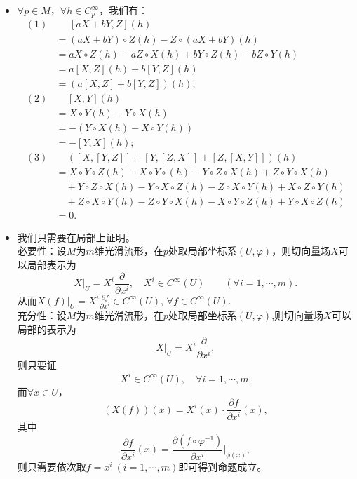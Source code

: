 
	\begin {itemize}
        \item[2.]
	${\forall} p \in M$，${\forall} h \in  C^\infty_p$，我们有：
\begin{equation*} %
	  	\begin{split}
	  	(1)&\quad\ \,	[aX+bY,Z](h)\\
	  		& = (aX+bY)\circ Z(h)-Z\circ(aX+bY)(h)\\
	  		& = aX\circ Z(h)-aZ\circ X(h)+bY\circ Z(h)-bZ\circ Y(h) \\
	  		& = a[X,Z](h)+b[Y,Z](h)\\
	  		& =(a[X,Z]+b[Y,Z]) (h);\\
	  	(2)&\quad\,	[X,Y](h)\\
  		& = X\circ Y(h)-Y\circ X(h)\\
  		& = -(Y\circ X(h)-X\circ Y(h))\\
  		& = -[Y,X](h);\\
  		(3)&\quad\,	([X,[Y,Z]]+[Y,[Z,X]]+[Z,[X,Y]])(h)\\
		& = X\circ Y\circ Z(h)- X\circ Y\circ (h)- Y\circ Z\circ X(h)+Z\circ Y\circ X(h)\\
		& \quad +Y\circ Z\circ X(h)- Y\circ X\circ Z(h)- Z\circ X\circ Y(h)+ X\circ Z\circ Y(h)\\
		& \quad +Z\circ X\circ Y(h)- Z\circ Y\circ X(h)- X\circ Y\circ Z(h)+Y\circ X\circ Z(h)\\
	    &=0.
    \end{split}
  \end{equation*} 
 
	  
\item[4.]
	我们只需要在局部上证明。\\
    必要性：设$M$为$m$维光滑流形，在$p$处取局部坐标系$(U,\varphi)$，则切向量场$X$可以局部表示为
    \[X|_U=X^i\frac{\partial}{\partial x^i}, \quad X^i \in C^\infty(U)\qquad(\forall i=1,\cdots, m).\]
    从而$X(f)|_U=X^i\frac{\partial f}{\partial x^i} \in C^\infty(U),\,\forall f \in C^\infty(U)$.
    \\
    充分性：设$M$为$m$维光滑流形，在$p$处取局部坐标系$(U,\varphi)$,则切向量场$X$可以局部的表示为
    \[X|_U=X^i\frac{\partial}{\partial x^i},\]
    则只要证\[X^i \in C^\infty (U),\quad \forall i=1,\cdots, m.\]
    而$\forall x \in U $，
    \[(X(f))(x)=X^i(x)·\frac{\partial f}{\partial x^i}(x),\]
    其中
    \[\frac{\partial f}{\partial x^i}(x)=\frac{\partial (f\circ \varphi ^{-1})}{\partial x^i}\bigg|_{\phi(x)},\]
    则只需要依次取$f=x^i\ (i=1,\cdots, m)$即可得到命题成立。
  

\end{itemize}
